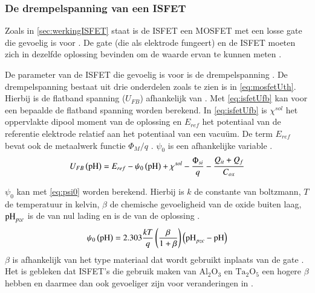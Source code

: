 \subsubsection{De drempelspanning van een ISFET}
Zoals in \cref{sec:werkingISFET} staat is de ISFET een MOSFET met een losse gate die gevoelig is voor \si{\pH} \cite{modeling,isfetAsAnElectronicDevice,bergveld1985impactOfMosfetBasedSensors,bergveld2003thirtyYearsISFET}. De gate (die als elektrode fungeert) en de ISFET moeten zich in dezelfde oplossing bevinden om de \si{\pH} waarde ervan te kunnen meten \cite{modeling,isfetAsAnElectronicDevice,bergveld1985impactOfMosfetBasedSensors,bergveld2003thirtyYearsISFET}.

De parameter van de ISFET die gevoelig is voor \si{\pH} is de drempelspanning \cite{isfetAsAnElectronicDevice,bergveld2003thirtyYearsISFET,bergveld1985impactOfMosfetBasedSensors}. De drempelspanning bestaat uit drie onderdelen zoals te zien is in \cref{eq:mosfetUth}. Hierbij is de flatband spanning ($U_{FB}$) afhankelijk van \si{\pH} \cite{isfetAsAnElectronicDevice,bergveld1985impactOfMosfetBasedSensors,bergveld2003thirtyYearsISFET}. Met \cref{eq:isfetUfb} kan voor een bepaalde \si{\pH} de flatband spanning worden berekend. In \cref{eq:isfetUfb} is $\chi^{sol}$ het oppervlakte dipool moment van de oplossing en $E_{ref}$ het potentiaal van de referentie elektrode relatief aan het potentiaal van een vacuüm. De term $E_{ref}$ bevat ook de metaalwerk functie $\Phi_M/q$ \cite{isfetAsAnElectronicDevice,bergveld2003thirtyYearsISFET,bergveld1985impactOfMosfetBasedSensors}. $\psi_0$ is een \si{\pH} afhankelijke variable \cite{isfetAsAnElectronicDevice,bergveld1985impactOfMosfetBasedSensors,bergveld2003thirtyYearsISFET}.
\begin{equation}\label{eq:isfetUfb}
    U_{FB}\left(\ph\right)=E_{ref}-\psi_0\left(\ph\right)+\chi^{sol}-\frac{\Phi_{si}}{q}-\frac{Q_{it}+Q_f}{C_{ox}}
    \tagaddtext{[\si{\volt}]}
\end{equation}

$\psi_0$ kan met \cref{eq:psi0} worden berekend. Hierbij is $k$ de constante van boltzmann, $T$ de temperatuur in kelvin, $\beta$ de chemische gevoeligheid van de oxide buiten laag, $\si{\pH}_{pzc}$ is de \si{\pH} van nul lading en \si{\pH} is de \si{\pH} van de oplossing \cite{bergveld2003thirtyYearsISFET,bergveld1985impactOfMosfetBasedSensors}.
\begin{equation}\label{eq:psi0}
    \psi_0\left(\ph\right)=2.303\frac{kT}{q}\left(\frac{\beta}{1+\beta}\right)\left(\ph_{pzc}-\ph\right)
    \tagaddtext{[\si{\volt}]}
\end{equation}
$\beta$ is afhankelijk van het type materiaal dat wordt gebruikt inplaats van de gate \cite{bergveld2003thirtyYearsISFET,bergveld1985impactOfMosfetBasedSensors}. Het is gebleken dat ISFET's die gebruik maken van $\mathrm{Al_{2}O_3}$ en $\mathrm{Ta_2O_5}$ een hogere $\beta$ hebben en daarmee dan ook gevoeliger zijn voor veranderingen in \si{\pH} \cite{bergveld2003thirtyYearsISFET,bergveld1985impactOfMosfetBasedSensors}.

